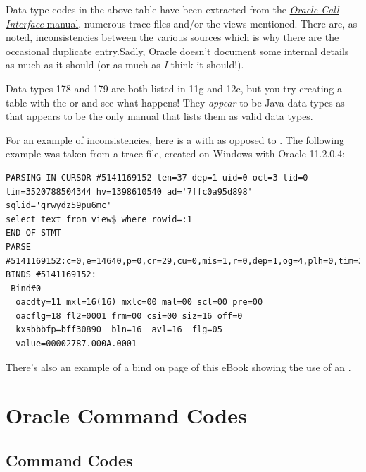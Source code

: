 \begin{appendix}
Data type codes in the above table have been extracted from the \href{http://docs.oracle.com/database/122/LNOCI/data-types.htm\#LNOCI16266}{\emph{Oracle Call
Interface} manual}, numerous trace files and/or the views mentioned. There are, as noted, inconsistencies between the various sources which is why there are the occasional duplicate entry.Sadly, Oracle doesn't document some internal details as much as it should (or as much as \textit{I} think it should!).

\begin{note}
Data types 178 and 179 are both listed in 11g and 12c, but you try creating a table with the  or  and see what happens! They \emph{appear} to be Java data types as that appears to be the only manual that lists them as valid data types.
\end{note}

For an example of inconsistencies, here is a  with  as opposed to . The following example was taken from a trace file, created on Windows with Oracle 11.2.0.4:

\begin{lstlisting}[numbers=none,caption={Bind Example - \inline{ROWID} With \inline{oacdty=11}}]
PARSING IN CURSOR #5141169152 len=37 dep=1 uid=0 oct=3 lid=0 tim=3520788504344 hv=1398610540 ad='7ffc0a95d898' sqlid='grwydz59pu6mc'
select text from view$ where rowid=:1
END OF STMT
PARSE #5141169152:c=0,e=14640,p=0,cr=29,cu=0,mis=1,r=0,dep=1,og=4,plh=0,tim=3520788504343
BINDS #5141169152:
 Bind#0
  oacdty=11 mxl=16(16) mxlc=00 mal=00 scl=00 pre=00
  oacflg=18 fl2=0001 frm=00 csi=00 siz=16 off=0
  kxsbbbfp=bff30890  bln=16  avl=16  flg=05
  value=00002787.000A.0001
\end{lstlisting}  
  
There's also an example of a  bind on page \pageref{ref-cursor-102} of this eBook showing the use of an .

\chapter{Oracle Command Codes}\label{oracle-command-codes}

\section*{Command Codes}\label{command-codes}


\end{appendix}

